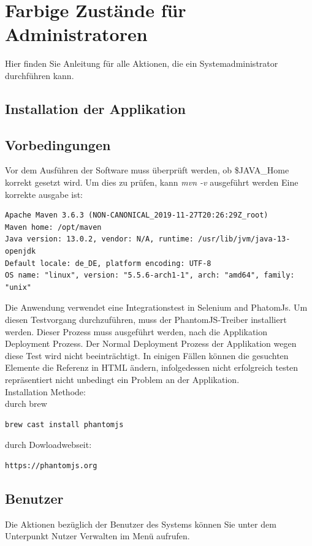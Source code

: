 \documentclass[enabledeprecatedfontcommands,fontsize=12pt,paper=a4,twoside]{scrartcl}
\begin{document}

\newpage
\section{Farbige Zustände für Administratoren}
Hier finden Sie Anleitung für alle Aktionen, die ein Systemadministrator durchführen kann. 
\subsection{Installation der Applikation}
\subsection{Vorbedingungen}
Vor dem Ausführen der Software muss überprüft werden, ob \$JAVA\_Home korrekt gesetzt wird.
Um dies zu prüfen, kann \textit{mvn -v} ausgeführt werden
Eine korrekte ausgabe ist:
\begin{verbatim}
Apache Maven 3.6.3 (NON-CANONICAL_2019-11-27T20:26:29Z_root)
Maven home: /opt/maven
Java version: 13.0.2, vendor: N/A, runtime: /usr/lib/jvm/java-13-openjdk
Default locale: de_DE, platform encoding: UTF-8
OS name: "linux", version: "5.5.6-arch1-1", arch: "amd64", family: "unix"
\end{verbatim}

Die Anwendung verwendet eine Integrationstest in Selenium and PhatomJs. Um diesen Testvorgang durchzuführen, muss der PhantomJS-Treiber installiert werden. Dieser Prozess muss ausgeführt werden, nach die Applikation Deployment Prozess. Der Normal Deployment Prozess der Applikation wegen diese Test wird nicht beeinträchtigt. In einigen Fällen können die gesuchten Elemente die Referenz in HTML ändern, infolgedessen nicht erfolgreich testen repräsentiert nicht unbedingt ein Problem an der Applikation.\\

Installation Methode:\\
durch brew
\begin{verbatim}
brew cast install phantomjs
\end{verbatim}
durch Dowloadwebseit:
\begin{verbatim}
https://phantomjs.org
\end{verbatim}
\subsection{Benutzer}
Die Aktionen bezüglich der Benutzer des Systems können Sie unter dem Unterpunkt Nutzer Verwalten im Menü aufrufen. \\
\end{document}

